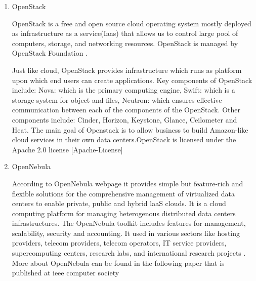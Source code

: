 \begin{enumerate}
\item {} 
OpenStack

OpenStack \label{\detokenize{i524/technologies:id634}}{\hyperref[\detokenize{i524/technologies:www-openstack-org}]{\sphinxcrossref{{[}548{]}}}} is a free and open source cloud operating
system mostly deployed as infrastructure as a service(Iaas) that allows
us to control large pool of computers, storage, and networking resources.
OpenStack is managed by OpenStack Foundation \label{\detokenize{i524/technologies:id635}}{\hyperref[\detokenize{i524/technologies:www-openstack-found}]{\sphinxcrossref{{[}549{]}}}}.

Just like cloud, OpenStack provides infrastructure which runs as platform
upon which end users can create applications. Key components of OpenStack
include: Nova: which is the primary computing engine, Swift: which is a
storage system for object and files, Neutron: which ensures effective
communication between each of the components of the OpenStack. Other
components include: Cinder, Horizon, Keystone, Glance, Ceilometer and
Heat. The main goal of Openstack is to allow business to build
Amazon-like cloud services in their own data centers.OpenStack is
licensed under the Apache 2.0 license {[}Apache-License{]}

\item {} 
OpenNebula

According to OpenNebula webpage \label{\detokenize{i524/technologies:id637}}{\hyperref[\detokenize{i524/technologies:www-opennebula-org}]{\sphinxcrossref{{[}550{]}}}} it
provides simple but feature-rich and flexible solutions for the
comprehensive management of virtualized data centers to enable
private, public and hybrid laaS clouds. It is a cloud computing
platform for managing heterogenous distributed data centers
infrastructures. The OpenNebula toolkit includes features for
management, scalability, security and accounting. It used in
various sectors like hosting providers, telecom providers,
telecom operators, IT service providers, supercomputing centers,
research labs, and international research projects
\label{\detokenize{i524/technologies:id638}}{\hyperref[\detokenize{i524/technologies:www-opennebula-wiki}]{\sphinxcrossref{{[}551{]}}}}. More about OpenNebula can be found
in the following paper that is published at ieee computer society
\label{\detokenize{i524/technologies:id639}}{\hyperref[\detokenize{i524/technologies:paper-opennebula}]{\sphinxcrossref{{[}552{]}}}}


\end{enumerate}
